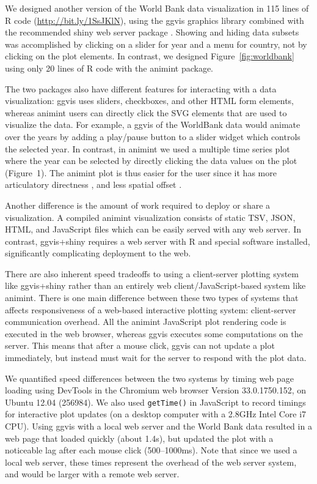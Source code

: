 \documentclass[journal]{vgtc}\usepackage[]{graphicx}\usepackage[]{color}
\begin{document}
We designed another version of the World Bank data visualization in 115
lines of R code (\url{http://bit.ly/1SsJKlN}), using the ggvis
graphics library combined with the recommended shiny web server
package \citep{shiny, ggvis}. Showing and hiding data subsets was
accomplished by clicking on a slider for year and a menu for country,
not by clicking on the plot elements. In contrast, we designed
Figure~\ref{fig:worldbank} using only 20 lines of R code with 
the animint package.

The two packages also have different features for interacting with a
data visualization: ggvis uses sliders, checkboxes, and other HTML
form elements, whereas animint users can directly click the SVG
elements that are used to visualize the data. For example, a ggvis of
the WorldBank data would animate over the years by adding a play/pause
button to a slider widget which controls the selected year. In
contrast, in animint we used a multiple time series plot where the
year can be selected by directly clicking the data values on the plot
(Figure~1). The animint plot is thus easier for the user since it has
more articulatory directness \citep{Hutchins:1985}, and less spatial
offset \citep{instrumental-interaction}.

Another difference is the amount of work required to deploy or share a
visualization. A compiled animint visualization consists of static
TSV, JSON, HTML, and JavaScript files which can be easily served with
any web server. In contrast, ggvis+shiny requires a web server with R
and special software installed, significantly complicating
deployment to the web.

There are also inherent speed tradeoffs to using a client-server
plotting system like ggvis+shiny rather than an entirely web
client/JavaScript-based system like animint. There is one main
difference between these two types of systems that affects
responsiveness of a web-based interactive plotting system:
client-server communication overhead. All the animint
JavaScript plot rendering code is executed in the web browser, whereas
ggvis executes some computations on the server. This means that after
a mouse click, ggvis can not update a plot immediately, but instead
must wait for the server to respond with the plot data.

We quantified speed differences between the two systems by timing web
page loading using DevTools in the Chromium web browser Version
33.0.1750.152, on Ubuntu 12.04 (256984). We also used \texttt{getTime()}
in JavaScript to record timings for interactive plot updates (on a
desktop computer with a 2.8GHz Intel Core i7 CPU). Using ggvis with a
local web server and the World Bank data resulted in a web page that
loaded quickly (about 1.4s), but updated the plot with a noticeable
lag after each mouse click (500--1000ms). Note that since we used a
local web server, these times represent the overhead of the web server
system, and would be larger with a remote web server.
\end{document}
